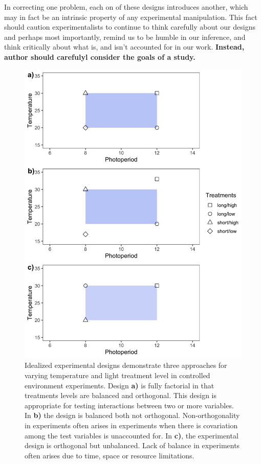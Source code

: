 \documentclass[11pt]{article}
\begin{document}
In correcting one problem, each on of these designs introduces another, which may in fact be an intrinsic property of any experimental manipulation. This fact should caution experimentalists to continue to think carefully about our designs and perhaps most importantly, remind us to be humble in our inference, and think critically about what is, and isn't accounted for in our work. \textbf{Instead, author should carefulyl consider the goals of a study.}


\begin{figure}[h!]
    \centering
 \includegraphics[width=.8\textwidth]{..//Plots/periodicity_figures/orthog.jpeg}
    \caption{Idealized experimental designs demonstrate three approaches for varying temperature and light treatment level in controlled environment experiments. Design \textbf{a)} is fully factorial in that treatments levels are balanced and orthogonal. This design is appropriate for testing interactions between two or more variables. In \textbf{b)} the design is balanced both not orthogonal. Non-orthogonality in experiments often arises in experiments when there is covariation among the test variables is unaccounted for. In \textbf{c)}, the experimental design is orthogonal but unbalanced. Lack of balance in experiments often arises due to time, space or resource limitations. }
    \label{fig:examp}
\end{figure}
\end{document}

